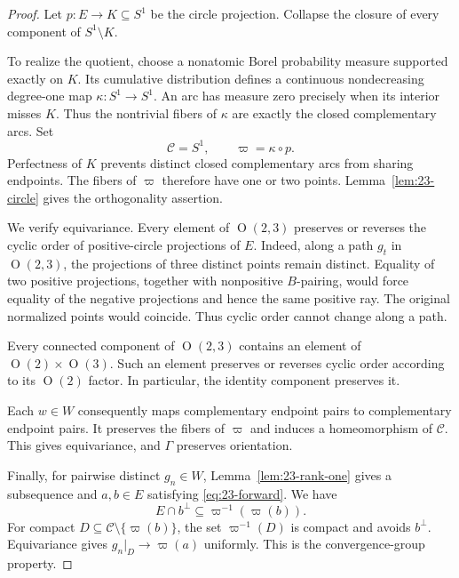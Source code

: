\documentclass[11pt,reqno]{amsart}
\theoremstyle{plain}
\theoremstyle{definition}
\theoremstyle{remark}
\numberwithin{equation}{section}
\begin{document}
\begin{proof}
Let $p:E\to K\subseteq S^1$ be the circle projection. Collapse the closure of every component of $S^1\setminus K$.

To realize the quotient, choose a nonatomic Borel probability measure supported exactly on $K$. Its cumulative distribution defines a continuous nondecreasing degree-one map $\kappa:S^1\to S^1$. An arc has measure zero precisely when its interior misses $K$. Thus the nontrivial fibers of $\kappa$ are exactly the closed complementary arcs. Set
\[
\mathcal C=S^1,\qquad\varpi=\kappa\circ p.
\]
Perfectness of $K$ prevents distinct closed complementary arcs from sharing endpoints. The fibers of $\varpi$ therefore have one or two points. Lemma~\ref{lem:23-circle} gives the orthogonality assertion.

We verify equivariance. Every element of $\operatorname{O}(2,3)$ preserves or reverses the cyclic order of positive-circle projections of $E$. Indeed, along a path $g_t$ in $\operatorname{O}(2,3)$, the projections of three distinct points remain distinct. Equality of two positive projections, together with nonpositive $B$-pairing, would force equality of the negative projections and hence the same positive ray. The original normalized points would coincide. Thus cyclic order cannot change along a path.

Every connected component of $\operatorname{O}(2,3)$ contains an element of $\operatorname{O}(2)\times\operatorname{O}(3)$. Such an element preserves or reverses cyclic order according to its $\operatorname{O}(2)$ factor. In particular, the identity component preserves it.

Each $w\in W$ consequently maps complementary endpoint pairs to complementary endpoint pairs. It preserves the fibers of $\varpi$ and induces a homeomorphism of $\mathcal C$. This gives equivariance, and $\Gamma$ preserves orientation.

Finally, for pairwise distinct $g_n\in W$, Lemma~\ref{lem:23-rank-one} gives a subsequence and $a,b\in E$ satisfying \eqref{eq:23-forward}. We have
\[
E\cap b^\perp\subseteq\varpi^{-1}(\varpi(b)).
\]
For compact $D\subseteq\mathcal C\setminus\{\varpi(b)\}$, the set $\varpi^{-1}(D)$ is compact and avoids $b^\perp$. Equivariance gives $g_n|_D\to\varpi(a)$ uniformly. This is the convergence-group property.
\end{proof}
\end{document}
